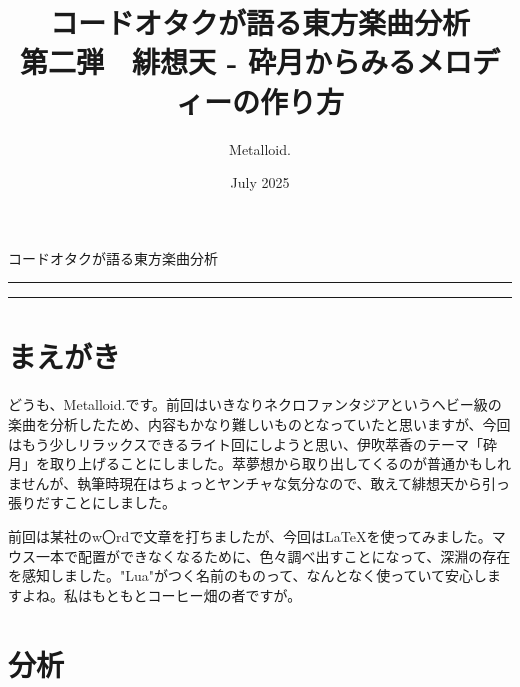 \documentclass[11pt]{ltjarticle}
\title{コードオタクが語る東方楽曲分析 \\ \large{第二弾　緋想天 - 砕月からみるメロディーの作り方}}
\author{Metalloid.}
\date{July 2025}
\begin{document}

{\huge{コードオタクが語る東方楽曲分析}}
\vspace{3pt}
\hrule
\vspace{3pt}
\vspace{12pt}  

\tableofcontents

\vspace{12pt}
\hrule

\section{まえがき}
どうも、Metalloid.です。前回はいきなりネクロファンタジアというヘビー級の楽曲を分析したため、内容もかなり難しいものとなっていたと思いますが、今回はもう少しリラックスできるライト回にしようと思い、伊吹萃香のテーマ「砕月」を取り上げることにしました。萃夢想から取り出してくるのが普通かもしれませんが、執筆時現在はちょっとヤンチャな気分なので、敢えて緋想天から引っ張りだすことにしました。\par
前回は某社のw〇rdで文章を打ちましたが、今回は\LaTeX{}を使ってみました。マウス一本で配置ができなくなるために、色々調べ出すことになって、深淵の存在を感知しました。"Lua"がつく名前のものって、なんとなく使っていて安心しますよね。私はもともとコーヒー畑の者ですが。
\section{分析}
\end{document}
